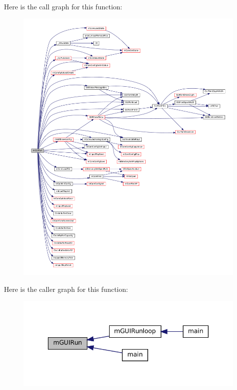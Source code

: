 Here is the call graph for this function\+:
\nopagebreak
\begin{figure}[H]
\begin{center}
\leavevmode
\includegraphics[width=350pt]{gui-runner_8c_a1285400b234548c4116a1965de5449eb_cgraph}
\end{center}
\end{figure}
Here is the caller graph for this function\+:
\nopagebreak
\begin{figure}[H]
\begin{center}
\leavevmode
\includegraphics[width=340pt]{gui-runner_8c_a1285400b234548c4116a1965de5449eb_icgraph}
\end{center}
\end{figure}
\mbox{\label{gui-runner_8c_a18b60d93179a62db9bb8c6b0fde56138}} 
